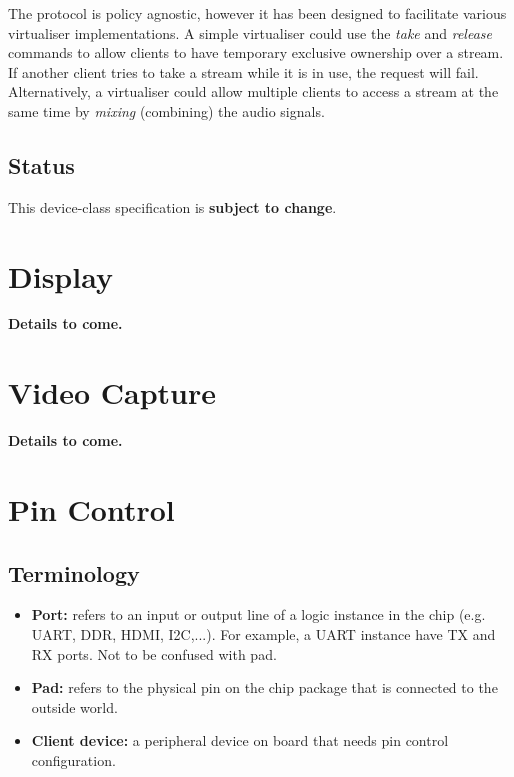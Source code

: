 \documentclass[a4paper,12pt]{report}
\newcommand{\ToCome}[1]{\textbf{#1 to come.}}
\begin{document}
The protocol is policy agnostic, however it has been designed to facilitate
various virtualiser implementations. A simple virtualiser could use the
\textit{take} and \textit{release} commands to allow clients to have temporary
exclusive ownership over a stream. If another client tries to take a stream
while it is in use, the request will fail. Alternatively, a virtualiser could
allow multiple clients to access a stream at the same time by \textit{mixing}
(combining) the audio signals.


\subsection{Status}

This device-class specification is \textbf{subject to change}.

\section{Display}\label{s:cl-display}

\ToCome{Details}

\section{Video Capture}\label{s:cl-camera}

\ToCome{Details}


\section{Pin Control}\label{s:pins}

\subsection{Terminology}
\begin{itemize}
  \item \textbf{Port:} refers to an input or output line of a logic instance in the chip
    (e.g. UART, DDR, HDMI, I2C,...). For example, a UART instance have TX and RX ports.
    Not to be confused with pad.
  \item \textbf{Pad:} refers to the physical pin on the chip package that is connected to
    the outside world.
  \item \textbf{Client device:} a peripheral device on board that needs pin control configuration.
\end{itemize}
\end{document}
